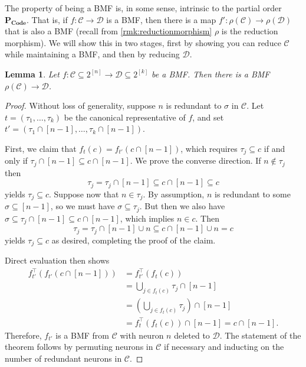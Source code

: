\documentclass[11pt,letterpaper, reqno]{amsart}
\newtheorem{lem}[thm]{Lemma}         %
\theoremstyle{definition}
\def\cC{\mathcal{C}}
\def\cD{\mathcal{D}}
\def\pcode{\mathbf{P_{Code}}}
\begin{document}
        The property of being a BMF is, in some sense, intrinsic to the partial order $\pcode$.
        That is, if $f: \cC \to \cD$ is a BMF, then there is a map $f': \rho(\cC) \to \rho(\cD)$ that is also a BMF (recall from \cref{rmk:reductionmorphism} $\rho$ is the reduction morphism).
        We will show this in two stages, first by showing you can reduce $\cC$ while maintaining a BMF, and then by reducing $\cD$.
        \begin{lem}\label{lem:BMFreducesource}
            Let $f: \cC \subseteq 2^{[n]} \to \cD \subseteq2^{[k]}$ be a BMF. Then there is a BMF $\rho(\cC) \to \cD$.
        \end{lem}
        \begin{proof}
            Without loss of generality, suppose $n$ is redundant to $\sigma$ in $\cC$.
            Let $t = (\tau_1,\dots,\tau_k)$ be the canonical representative of $f$, and set $t' = (\tau_1\cap[n-1],\dots,\tau_k\cap[n-1])$.

            First, we claim that $f_t(c) = f_{t'}(c\cap[n-1])$, which requires $\tau_j \subseteq c$ if and only if $\tau_j\cap[n-1] \subseteq c\cap[n-1]$.
            We prove the converse direction.
            If $n\not \in \tau_j$ then \[ \tau_j=\tau_j \cap [n-1] \subseteq c \cap [n-1]\subseteq c \] yields $\tau_j \subseteq c$.
            Suppose now that $n \in \tau_j$.
            By assumption, $n$ is redundant to some $\sigma \subseteq [n-1]$, so we must have $\sigma\subseteq\tau_j$.
            But then we also have $\sigma \subseteq \tau_j \cap [n-1] \subseteq c\cap[n-1]$, which implies $n \in c$.
            Then \[ \tau_j = \tau_j\cap[n-1]\cup n \subseteq c\cap [n-1] \cup n = c \] yields $\tau_j \subseteq c$ as desired, completing the proof of the claim.

            Direct evaluation then shows
            \begin{align*}
                f_{t'}^\top(f_{t'}(c \cap [n-1])) & = f_{t'}^\top(f_t(c))\\
                    & = \bigcup_{j \in f_t(c)} \tau_j \cap [n-1]\\
                    & = \left(\bigcup_{j\in f_t(c)} \tau_j\right) \cap [n-1]\\
                    & = f_t^\top(f_t(c)) \cap [n-1] = c \cap [n-1].
            \end{align*}
            Therefore, $f_{t'}$ is a BMF from $\cC$ with neuron $n$ deleted to $\cD$. The statement of the theorem follows by permuting neurons in $\cC$ if necessary and inducting on the number of redundant neurons in $\cC$.
        \end{proof}
\end{document}
